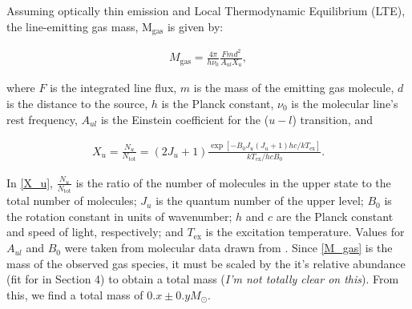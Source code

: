 


\iffalse
Tables 2 and 3 present the velocity-integrated line fluxes and the best-fit parameters for a simple elliptical Gaussian fit to the visibilities for each disk, respectively. Integrated line flux was measured using the MIRIAD task \texttt{cgcurs} to integrate the intensity in the zeroth-moment map throughout the region enclosed by the 3 $\sigma$ contour level. Uncertainties in the integrated line flux do not include the 10\% absolute flux calibration uncertainty inherent in the ALMA observations caused by uncertainties int he models of solar system objects used as flux callibrators. Elliptical Gaussian fits of the visibilities were performed using the MIRIAD task \texttt{uvfit}.
\fi

\bigskip

Assuming optically thin emission and Local Thermodynamic Equilibrium (LTE), the line-emitting gas mass, M$_{\text{gas}}$ is given by:

\begin{align}
  M_{\text{gas}}= \frac{4 \pi}{h \nu_0} \frac{F m d^2}{A_{ul} X_u},
  \label{M_gas}
\end{align}

where $F$ is the integrated line flux, $m$ is the mass of the emitting gas molecule, $d$ is the distance to the source, $h$ is the Planck constant, $\nu_0$ is the molecular line's rest frequency, $A_{ul}$ is the Einstein coefficient for the ($u - l$) transition, and

\begin{align}
  X_u = \frac{N_u}{N_{\text{tot}}} = (2 J_u + 1) \frac{\exp [-B_0 J_u (J_u + 1) h c/kT_{\text{ex}}]}{kT_{\text{ex}}/hc B_0}.
  \label{X_u}
\end{align}

In \ref{X_u}, $\frac{N_u}{N_{\text{tot}}}$ is the ratio of the number of molecules in the upper state to the total number of molecules; $J_u$ is the quantum number of the upper level; $B_0$ is the rotation constant in units of wavenumber; $h$ and $c$ are the Planck constant and speed of light, respectively; and $T_{\text{ex}}$ is the excitation temperature. Values for $A_{ul}$ and $B_0$ were taken from molecular data drawn from \citet{Schoeier_et_al_2005}. Since \ref{M_gas} is the mass of the observed gas species, it must be scaled by the it's relative abundance (fit for in Section 4) to obtain a total mass (\textit{I'm not totally clear on this}). From this, we find a total mass of $0.x \pm 0.y M_{\odot}$.



